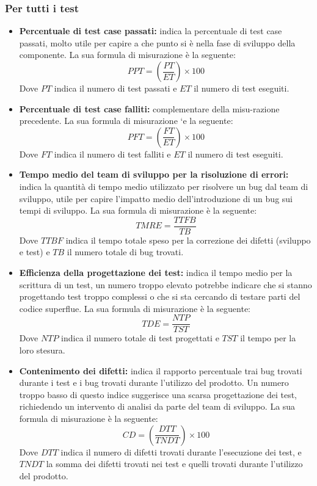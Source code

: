 \subsubsection{Per tutti i test}
\begin{itemize}
    \item \textbf{Percentuale di test case passati:} indica la percentuale di test case passati,  molto utile per capire a che punto si è nella fase di sviluppo della componente.  La sua formula di misurazione è la seguente:\newline
    \[
		PPT=(\frac{PT}{ET}) \times 100
	\]	
	Dove $PT$ indica il numero di test passati e $ET$ il numero di test eseguiti.
    \item \textbf{Percentuale di test case falliti:} complementare della misu-razione precedente.  La sua formula di misurazione `e la seguente:\newline
    \[
		PFT=(\frac{FT}{ET}) \times 100
	\]	
	Dove $FT$ indica il numero di test falliti e $ET$ il numero di test eseguiti.
    \item \textbf{Tempo medio del team di sviluppo per la risoluzione di errori:} indica  la  quantità  di  tempo  medio  utilizzato  per  risolvere  un  bug dal team di sviluppo,  utile per capire l’impatto medio dell’introduzione di un bug sui tempi di sviluppo.  La sua formula di misurazione è la seguente:\newline
    \[
		TMRE=\frac{TTFB}{TB}
	\]	
	Dove $TTBF$ indica il tempo totale speso per la correzione dei difetti (sviluppo e test) e $TB$ il numero totale di bug trovati.
    \item \textbf{Efficienza  della  progettazione  dei  test:} indica  il  tempo medio per la scrittura di un test, un numero troppo elevato potrebbe indicare che si stanno progettando test troppo complessi o che si sta cercando di  testare  parti  del  codice  superflue.   La  sua  formula  di  misurazione  è  la seguente:\newline
    \[
		TDE=\frac{NTP}{TST}
	\]	
	Dove $NTP$ indica il numero totale di test progettati e $TST$ il tempo per la loro stesura.
    \item \textbf{Contenimento dei difetti:} indica il rapporto percentuale trai bug trovati durante i test e i bug trovati durante l’utilizzo del prodotto.  Un numero  troppo  basso  di  questo  indice  suggerisce  una  scarsa  progettazione dei test, richiedendo un intervento di analisi da parte del team di sviluppo. La sua formula di misurazione è la seguente:\newline
    \[
		CD=(\frac{DTT}{TNDT}) \times 100
	\]	
	Dove $DTT$ indica il numero di difetti trovati durante l’esecuzione dei test, e $TNDT$ la somma dei difetti trovati nei test e quelli trovati durante l’utilizzo del prodotto.


\end{itemize}
